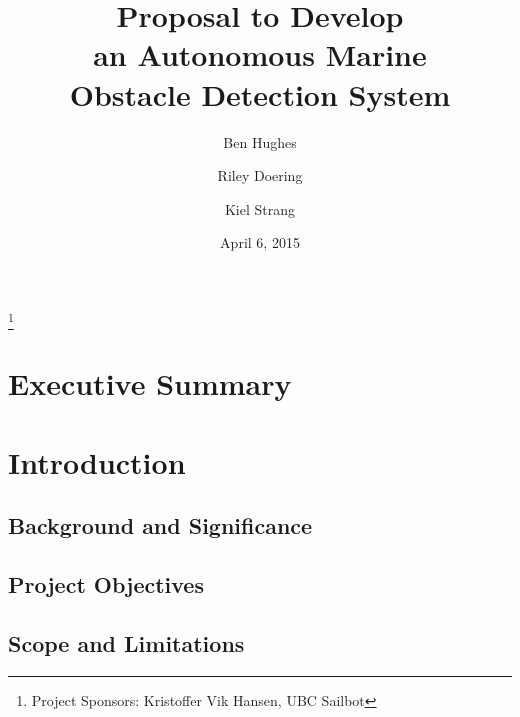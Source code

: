 \documentclass[amsmath, amssymb, aps, pra, 12pt]{revtex4-1}
\begin{document}
\title{Proposal to Develop\\an Autonomous Marine\\Obstacle Detection System}
\author{Ben Hughes}
\thanks{Project Sponsors: Kristoffer Vik Hansen, UBC Sailbot}
\author{Riley Doering}
\author{Kiel Strang}
\date{April 6, 2015}
\maketitle


\section*{Executive Summary}


\newpage
\tableofcontents

\makeatletter
\let\toc@pre\relax
\let\toc@post\relax
\makeatother 

\newpage
\listoffigures
\listoftables

\clearpage
\newpage
{}


\section{\label{sec:introduction}Introduction}


\subsection{\label{sec:introduction:backgroundandsignificance}Background and Significance}


\subsection{\label{sec:introduction:projectobjectives}Project Objectives}


\subsection{\label{sec:introduction:scopeandlimitations}Scope and Limitations}

\end{document}
